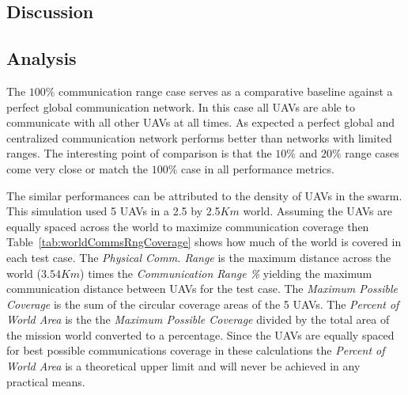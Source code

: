 \begin{multicols*}{2}



\chapter{Discussion}
\label{chap:discussion}

\section{Analysis}

The $100\%$ communication range case serves as a comparative baseline against a perfect global communication network.  In this case all UAVs are able to communicate with all other UAVs at all times.  As expected a perfect global and centralized communication network performs better than networks with limited ranges.  The interesting point of comparison is that the $10\%$ and $20\%$ range cases come very close or match the $100\%$ case in all performance metrics. 

The similar performances can be attributed to the density of UAVs in the swarm.  This simulation used 5 UAVs in a 2.5 by 2.5$Km$ world.  Assuming the UAVs are equally spaced across the world to maximize communication coverage then Table~\ref{tab:worldCommsRngCoverage} shows how much of the world is covered in each test case.  The \textit{Physical Comm. Range} is the maximum distance across the world ($3.54Km$) times the \textit{Communication Range \%} yielding the maximum communication distance between UAVs for the test case.  The \textit{Maximum Possible Coverage} is the sum of the circular coverage areas of the 5 UAVs.  The \textit{Percent of World Area} is the the \textit{Maximum Possible Coverage} divided by the total area of the mission world converted to a percentage.  Since the UAVs are equally spaced for best possible communications coverage in these calculations the \textit{Percent of World Area} is a theoretical upper limit and will never be achieved in any practical means.


\end{multicols*}
